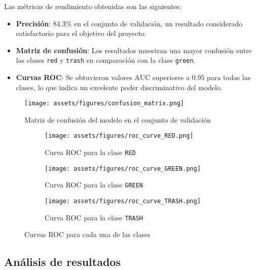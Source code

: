 Las métricas de rendimiento obtenidas son las siguientes:

\begin{itemize}
    \item \textbf{Precisión}: 84.3\% en el conjunto de validación, un resultado considerado satisfactorio para el objetivo del proyecto.
    
    \item \textbf{Matriz de confusión}: Los resultados muestran una mayor confusión entre las clases \texttt{red} y \texttt{trash} en comparación con la clase \texttt{green}.
    
    \item \textbf{Curvas ROC}: Se obtuvieron valores AUC superiores a 0.95 para todas las clases, lo que indica un excelente poder discriminativo del modelo.
\end{itemize}

\begin{figure}[ht]
    \centering
    \texttt{[image: assets/figures/confusion\_matrix.png]}
    \caption{Matriz de confusión del modelo en el conjunto de validación}
    \label{fig:confusion_matrix}
\end{figure}

\begin{figure}[ht]
    \centering
    \begin{subfigure}[b]{0.32\textwidth}
        \centering
        \texttt{[image: assets/figures/roc\_curve\_RED.png]}
        \caption{Curva ROC para la clase \texttt{RED}}
        \label{fig:roc_red}
    \end{subfigure}
    \hfill
    \begin{subfigure}[b]{0.32\textwidth}
        \centering
        \texttt{[image: assets/figures/roc\_curve\_GREEN.png]}
        \caption{Curva ROC para la clase \texttt{GREEN}}
        \label{fig:roc_green}
    \end{subfigure}
    \hfill
    \begin{subfigure}[b]{0.32\textwidth}
        \centering
        \texttt{[image: assets/figures/roc\_curve\_TRASH.png]}
        \caption{Curva ROC para la clase \texttt{TRASH}}
        \label{fig:roc_trash}
    \end{subfigure}
    \caption{Curvas ROC para cada una de las clases}
    \label{fig:roc_curves}
\end{figure}


\newpage
\subsection{Análisis de resultados}

